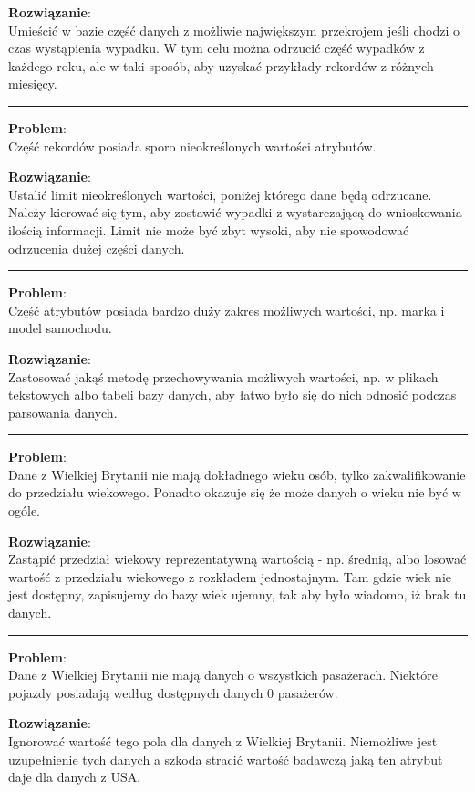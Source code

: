 \textbf{Rozwiązanie}:\\Umieścić w bazie część danych z możliwie
największym przekrojem jeśli chodzi o czas wystąpienia wypadku. W tym
celu można odrzucić część wypadków z każdego roku, ale w taki sposób,
aby uzyskać przykłady rekordów z różnych miesięcy.

\begin{center}\rule{3in}{0.4pt}\end{center}

\textbf{Problem}:\\Część rekordów posiada sporo nieokreślonych wartości
atrybutów.

\textbf{Rozwiązanie}:\\Ustalić limit nieokreślonych wartości, poniżej
którego dane będą odrzucane. Należy kierować się tym, aby zostawić
wypadki z wystarczającą do wnioskowania ilością informacji. Limit nie
może być zbyt wysoki, aby nie spowodować odrzucenia dużej części danych.

\begin{center}\rule{3in}{0.4pt}\end{center}

\textbf{Problem}:\\Część atrybutów posiada bardzo duży zakres możliwych
wartości, np. marka i model samochodu.

\textbf{Rozwiązanie}:\\Zastosować jakąś metodę przechowywania możliwych
wartości, np. w plikach tekstowych albo tabeli bazy danych, aby łatwo
było się do nich odnosić podczas parsowania danych.

\begin{center}\rule{3in}{0.4pt}\end{center}

\textbf{Problem}:\\Dane z Wielkiej Brytanii nie mają dokładnego wieku
osób, tylko zakwalifikowanie do przedziału wiekowego. Ponadto okazuje
się że może danych o wieku nie być w ogóle.

\textbf{Rozwiązanie}:\\Zastąpić przedział wiekowy reprezentatywną
wartością - np. średnią, albo losować wartość z przedziału wiekowego z
rozkładem jednostajnym. Tam gdzie wiek nie jest dostępny, zapisujemy do
bazy wiek ujemny, tak aby było wiadomo, iż brak tu danych.

\begin{center}\rule{3in}{0.4pt}\end{center}

\textbf{Problem}:\\Dane z Wielkiej Brytanii nie mają danych o wszystkich
pasażerach. Niektóre pojazdy posiadają według dostępnych danych 0
pasażerów.

\textbf{Rozwiązanie}:\\Ignorować wartość tego pola dla danych z Wielkiej
Brytanii. Niemożliwe jest uzupełnienie tych danych a szkoda stracić
wartość badawczą jaką ten atrybut daje dla danych z USA.
